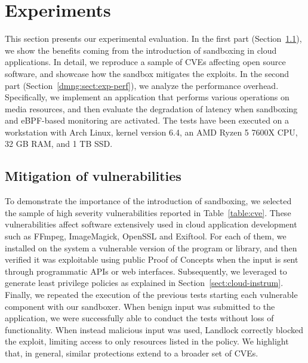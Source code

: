 \section{Experiments}\label{dmng:sect:exp}

This section presents our experimental evaluation. In the first part
(Section~\ref{dmng:sect:exp-mitig}), we show the benefits coming from the
introduction of sandboxing in cloud applications. In detail, we
reproduce a sample of CVEs affecting open source software, and
showcase how the sandbox mitigates the exploits. In the second part
(Section~\ref{dmng:sect:exp-perf}), we analyze the performance
overhead. Specifically, we implement an application that performs
various operations on media resources, and then evaluate the
degradation of latency when sandboxing and eBPF-based monitoring are
activated. The tests have been executed on a workstation with Arch
Linux, kernel version 6.4, an AMD Ryzen 5 7600X CPU, 32 GB RAM, and 1
TB SSD.

\subsection{Mitigation of vulnerabilities}\label{dmng:sect:exp-mitig}

To demonstrate the importance of the introduction of sandboxing, we
selected the sample of high severity vulnerabilities reported in
Table~\ref{table:cve}. These vulnerabilities affect software
extensively used in cloud application development such as FFmpeg,
ImageMagick, OpenSSL and Exiftool. For each of them, we installed on
the system a vulnerable version of the program or library, and then
verified it was exploitable using public Proof of Concepts when the
input is sent through programmatic APIs or web
interfaces. Subsequently, we leveraged \dmng to generate least
privilege policies as explained in
Section~\ref{sect:cloud-instrum}. Finally, we repeated the execution
of the previous tests starting each vulnerable component with our
sandboxer. When benign input was submitted to the application, we were
successfully able to conduct the tests without loss of
functionality. When instead malicious input was used, Landlock
correctly blocked the exploit, limiting access to only resources
listed in the policy. We highlight that, in general, similar
protections extend to a broader set of CVEs.


